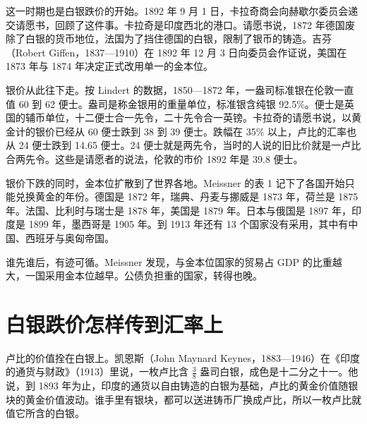 这一时期也是白银跌价的开始。1892 年 9 月 1 日，卡拉奇商会向赫歇尔委员会递交请愿书，回顾了这件事\cite{herschell1893}。卡拉奇是印度西北的港口。请愿书说，1872 年德国废除了白银的货币地位，法国为了挡住德国的白银，限制了银币的铸造\cite{herschell1893}。吉芬（Robert Giffen，1837—1910）在 1892 年 12 月 3 日向委员会作证说，美国在 1873 年与 1874 年决定正式改用单一的金本位\cite{herschell1893,wikisource24}。

银价从此往下走。按 Lindert 的数据，1850—1872 年，一盎司标准银在伦敦一直值 60 到 62 便士\cite{lindert2006}。盎司是称金银用的重量单位，标准银含纯银 92.5\%。便士是英国的辅币单位，十二便士合一先令，二十先令合一英镑。卡拉奇的请愿书说，以黄金计的银价已经从 60 便士跌到 38 到 39 便士\cite{herschell1893}。跌幅在 35\% 以上，卢比的汇率也从 24 便士跌到 14.65 便士\cite{herschell1893}。24 便士就是两先令，当时的人说的旧比价就是一卢比合两先令\cite{naoroji1901}。这些是请愿者的说法，伦敦的市价 1892 年是 39.8 便士\cite{lindert2006}。

银价下跌的同时，金本位扩散到了世界各地。Meissner 的表 1 记下了各国开始只能兑换黄金的年份\cite{meissner2002}。德国是 1872 年，瑞典、丹麦与挪威是 1873 年，荷兰是 1875 年\cite{meissner2002}。法国、比利时与瑞士是 1878 年，美国是 1879 年\cite{meissner2002}。日本与俄国是 1897 年，印度是 1899 年，墨西哥是 1905 年\cite{meissner2002}。到 1913 年还有 13 个国家没有采用，其中有中国、西班牙与奥匈帝国\cite{meissner2002}。

谁先谁后，有迹可循。Meissner 发现，与金本位国家的贸易占 GDP 的比重越大，一国采用金本位越早\cite{meissner2002}。公债负担重的国家，转得也晚\cite{meissner2002}。

\section{白银跌价怎样传到汇率上}\label{sec:periph-silver}

卢比的价值拴在白银上。凯恩斯（John Maynard Keynes，1883—1946）在《印度的通货与财政》（1913）里说，一枚卢比含 $\tfrac38$ 盎司白银，成色是十二分之十一\cite{keynes1913,wikisource24}。他说，到 1893 年为止，印度的通货以自由铸造的白银为基础，卢比的黄金价值随银块的黄金价值波动\cite{keynes1913}。谁手里有银块，都可以送进铸币厂换成卢比，所以一枚卢比就值它所含的白银。

